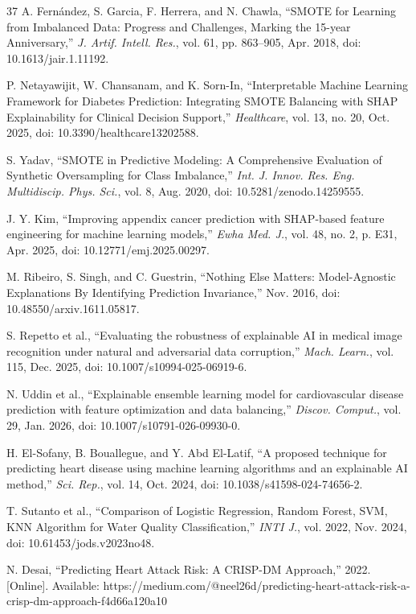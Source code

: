 \documentclass[conference]{IEEEtran}
\begin{document}
\begin{thebibliography}{37}
A. Fern\'{a}ndez, S. Garcia, F. Herrera, and N. Chawla, ``SMOTE for Learning from Imbalanced Data: Progress and Challenges, Marking the 15-year Anniversary,'' \textit{J. Artif. Intell. Res.}, vol. 61, pp. 863--905, Apr. 2018, doi: 10.1613/jair.1.11192.

P. Netayawijit, W. Chansanam, and K. Sorn-In, ``Interpretable Machine Learning Framework for Diabetes Prediction: Integrating SMOTE Balancing with SHAP Explainability for Clinical Decision Support,'' \textit{Healthcare}, vol. 13, no. 20, Oct. 2025, doi: 10.3390/healthcare13202588.

S. Yadav, ``SMOTE in Predictive Modeling: A Comprehensive Evaluation of Synthetic Oversampling for Class Imbalance,'' \textit{Int. J. Innov. Res. Eng. Multidiscip. Phys. Sci.}, vol. 8, Aug. 2020, doi: 10.5281/zenodo.14259555.

J. Y. Kim, ``Improving appendix cancer prediction with SHAP-based feature engineering for machine learning models,'' \textit{Ewha Med. J.}, vol. 48, no. 2, p. E31, Apr. 2025, doi: 10.12771/emj.2025.00297.

M. Ribeiro, S. Singh, and C. Guestrin, ``Nothing Else Matters: Model-Agnostic Explanations By Identifying Prediction Invariance,'' Nov. 2016, doi: 10.48550/arxiv.1611.05817.

S. Repetto et al., ``Evaluating the robustness of explainable AI in medical image recognition under natural and adversarial data corruption,'' \textit{Mach. Learn.}, vol. 115, Dec. 2025, doi: 10.1007/s10994-025-06919-6.

N. Uddin et al., ``Explainable ensemble learning model for cardiovascular disease prediction with feature optimization and data balancing,'' \textit{Discov. Comput.}, vol. 29, Jan. 2026, doi: 10.1007/s10791-026-09930-0.

H. El-Sofany, B. Bouallegue, and Y. Abd El-Latif, ``A proposed technique for predicting heart disease using machine learning algorithms and an explainable AI method,'' \textit{Sci. Rep.}, vol. 14, Oct. 2024, doi: 10.1038/s41598-024-74656-2.

T. Sutanto et al., ``Comparison of Logistic Regression, Random Forest, SVM, KNN Algorithm for Water Quality Classification,'' \textit{INTI J.}, vol. 2022, Nov. 2024, doi: 10.61453/jods.v2023no48.

N. Desai, ``Predicting Heart Attack Risk: A CRISP-DM Approach,'' 2022. [Online]. Available: https://medium.com/@neel26d/predicting-heart-attack-risk-a-crisp-dm-approach-f4d66a120a10


\end{thebibliography}
\end{document}

